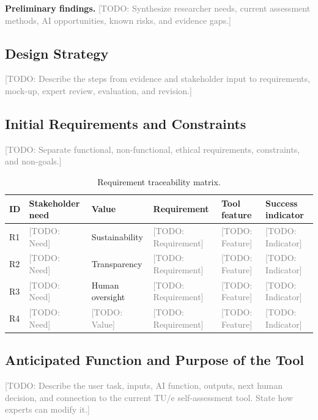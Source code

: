 \documentclass[11pt,a4paper]{article}
\newcommand{\placeholder}[1]{\textcolor{gray}{[TODO: #1]}}
\begin{document}
\textbf{Preliminary findings.}
\placeholder{Synthesize researcher needs, current assessment methods, AI opportunities, known risks, and evidence gaps.}

\FloatBarrier
\subsection{Design Strategy}
\placeholder{Describe the steps from evidence and stakeholder input to requirements, mock-up, expert review, evaluation, and revision.}

\FloatBarrier
\subsection{Initial Requirements and Constraints}
\placeholder{Separate functional, non-functional, ethical requirements, constraints, and non-goals.}

\begin{table}[htbp]
\centering
\caption{Requirement traceability matrix.}
\scriptsize
\begin{tabularx}{\textwidth}{@{}p{}p{}p{}XXX@{}}
\toprule
ID & Stakeholder need & Value & Requirement & Tool feature & Success indicator \\
\midrule
R1 & \placeholder{Need} & Sustainability & \placeholder{Requirement} & \placeholder{Feature} & \placeholder{Indicator} \\
R2 & \placeholder{Need} & Transparency & \placeholder{Requirement} & \placeholder{Feature} & \placeholder{Indicator} \\
R3 & \placeholder{Need} & Human oversight & \placeholder{Requirement} & \placeholder{Feature} & \placeholder{Indicator} \\
R4 & \placeholder{Need} & \placeholder{Value} & \placeholder{Requirement} & \placeholder{Feature} & \placeholder{Indicator} \\
\bottomrule
\end{tabularx}
\end{table}

\FloatBarrier
\subsection{Anticipated Function and Purpose of the Tool}
\placeholder{Describe the user task, inputs, AI function, outputs, next human decision, and connection to the current TU/e self-assessment tool. State how experts can modify it.}
\end{document}
